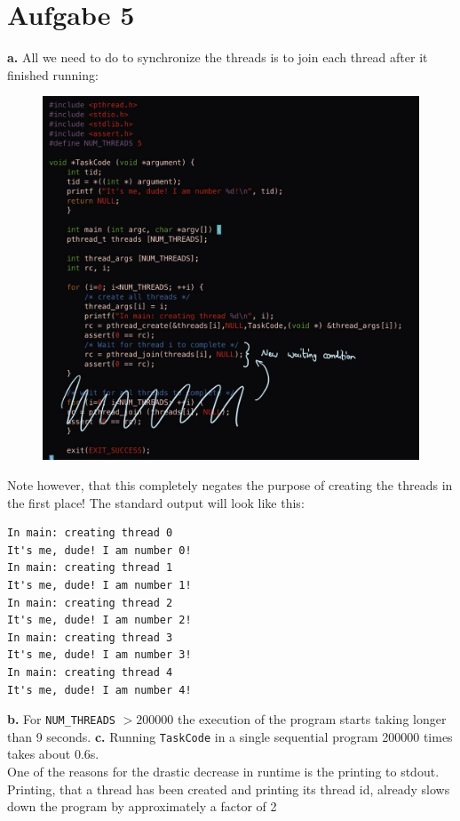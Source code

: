 \documentclass{article}
\begin{document}
\section*{Aufgabe 5}
\textbf{a.} All we need to do to synchronize the threads is to join each
thread after it finished running:
\begin{figure}[H]
    \centering
    \includegraphics[width=7\textwidth]{Threads.jpg}
\end{figure}
Note however, that this completely negates the purpose of creating the threads
in the first place! The standard output will look like this:
\begin{lstlisting}
In main: creating thread 0
It's me, dude! I am number 0!
In main: creating thread 1
It's me, dude! I am number 1!
In main: creating thread 2
It's me, dude! I am number 2!
In main: creating thread 3
It's me, dude! I am number 3!
In main: creating thread 4
It's me, dude! I am number 4!
\end{lstlisting}
\textbf{b.} For \texttt{NUM\_THREADS} \( > 200000 \) the execution of
the program starts taking longer than 9 seconds.
\textbf{c.} Running \texttt{TaskCode} in a single sequential program
200000 times takes about \( 0.6 \)s.\\
One of the reasons for the drastic decrease in runtime is the printing to
stdout. Printing, that a thread has been created and printing its
thread id, already slows down the program by approximately a factor of 2
\end{document}
